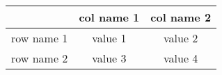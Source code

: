 \documentclass{article}
\begin{document}
\begin{table}
\begin{center}
\begin{tabular}
{ | c | c | c | }
\hline 
 & col name 1 & col name 2\\
\hline 
row name 1 & value 1 & value 2\\
\hline 
row name 2 & value 3 & value 4\\
\hline 
\end{tabular}
\end{center}
\end{table}
\end{document}
